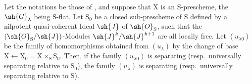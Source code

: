 \begin{proposition}[11.9.15]
\label{IV.11.9.15}
Let the notations be those of , and suppose that $\mathrm{X}$ is an $\mathrm{S}$-prescheme, the $\sh{G}_\lambda$ being $\mathrm{S}$-flat.
Let $\mathrm{S}_0$ be a closed sub-prescheme of $\mathrm{S}$ defined by a nilpotent quasi-coherent Ideal $\sh{J}$ of $\sh{O}_\mathrm{S}$, such that the $(\sh{O}_\mathrm{S}/\sh{J})$-Modules $\sh{J}^k/\sh{J}^{k+1}$ are all locally free.
Let $(u_{\lambda 0})$ be the family of homomorphisms obtained from $(u_\lambda)$ by the change of base $\mathrm{X}\leftarrow\mathrm{X}_0=\mathrm{X}\times_\mathrm{S}\mathrm{S}_0$.
Then, if the family $(u_{\lambda 0})$ is separating (resp.\ universally separating relative to $\mathrm{S}_0$), the family $(u_\lambda)$ is separating (resp.\ universally separating relative to $\mathrm{S}$).
\end{proposition}

